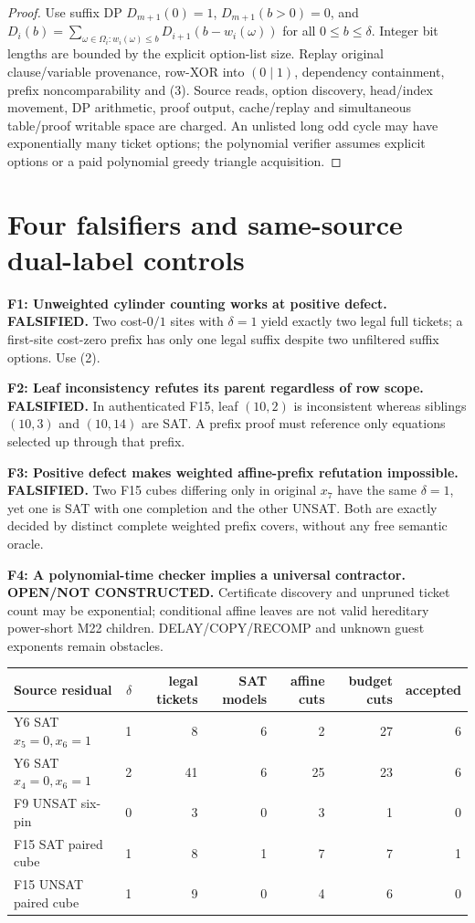 \documentclass[11pt]{article}
\begin{document}
\begin{proof}
Use suffix DP $D_{m+1}(0)=1$, $D_{m+1}(b>0)=0$, and
$D_i(b)=\sum_{\omega\in\Omega_i:w_i(\omega)\le b}D_{i+1}(b-w_i(\omega))$ for all $0\le b\le\delta$. Integer bit lengths are bounded by the explicit option-list size. Replay original clause/variable provenance, row-XOR into $(0\mid1)$, dependency containment, prefix noncomparability and (3). Source reads, option discovery, head/index movement, DP arithmetic, proof output, cache/replay and simultaneous table/proof writable space are charged. An unlisted long odd cycle may have exponentially many ticket options; the polynomial verifier assumes explicit options or a paid polynomial greedy triangle acquisition.
\end{proof}

\section{Four falsifiers and same-source dual-label controls}
\noindent\textbf{F1: Unweighted cylinder counting works at positive defect. FALSIFIED.} Two cost-$0/1$ sites with $\delta=1$ yield exactly two legal full tickets; a first-site cost-zero prefix has only one legal suffix despite two unfiltered suffix options. Use (2).

\noindent\textbf{F2: Leaf inconsistency refutes its parent regardless of row scope. FALSIFIED.} In authenticated F15, leaf $(10,2)$ is inconsistent whereas siblings $(10,3)$ and $(10,14)$ are SAT. A prefix proof must reference only equations selected up through that prefix.

\noindent\textbf{F3: Positive defect makes weighted affine-prefix refutation impossible. FALSIFIED.} Two F15 cubes differing only in original $x_7$ have the same $\delta=1$, yet one is SAT with one completion and the other UNSAT. Both are exactly decided by distinct complete weighted prefix covers, without any free semantic oracle.

\noindent\textbf{F4: A polynomial-time checker implies a universal contractor. OPEN/NOT CONSTRUCTED.} Certificate discovery and unpruned ticket count may be exponential; conditional affine leaves are not valid hereditary power-short M22 children. DELAY/COPY/RECOMP and unknown guest exponents remain obstacles.

\begin{center}\begin{tabular}{lrrrrrr}\toprule
Source residual&$\delta$&legal tickets&SAT models&affine cuts&budget cuts&accepted\\\midrule
Y6 SAT $x_5=0,x_6=1$&1&8&6&2&27&6\\
Y6 SAT $x_4=0,x_6=1$&2&41&6&25&23&6\\
F9 UNSAT six-pin&0&3&0&3&1&0\\
F15 SAT paired cube&1&8&1&7&7&1\\
F15 UNSAT paired cube&1&9&0&4&6&0\\\bottomrule
\end{tabular}\end{center}
\end{document}
